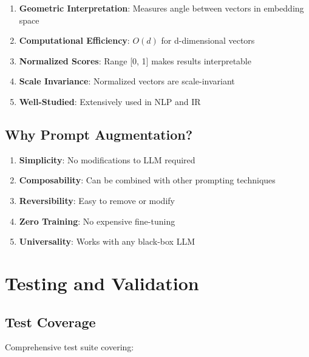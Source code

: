 \documentclass[11pt,a4paper]{article}
\begin{document}
\begin{enumerate}
    \item \textbf{Geometric Interpretation}: Measures angle between vectors in embedding space
    \item \textbf{Computational Efficiency}: $O(d)$ for d-dimensional vectors
    \item \textbf{Normalized Scores}: Range [0, 1] makes results interpretable
    \item \textbf{Scale Invariance}: Normalized vectors are scale-invariant
    \item \textbf{Well-Studied}: Extensively used in NLP and IR
\end{enumerate}

\subsection{Why Prompt Augmentation?}

\begin{enumerate}
    \item \textbf{Simplicity}: No modifications to LLM required
    \item \textbf{Composability}: Can be combined with other prompting techniques
    \item \textbf{Reversibility}: Easy to remove or modify
    \item \textbf{Zero Training}: No expensive fine-tuning
    \item \textbf{Universality}: Works with any black-box LLM
\end{enumerate}

\section{Testing and Validation}

\subsection{Test Coverage}

Comprehensive test suite covering:
\end{document}
